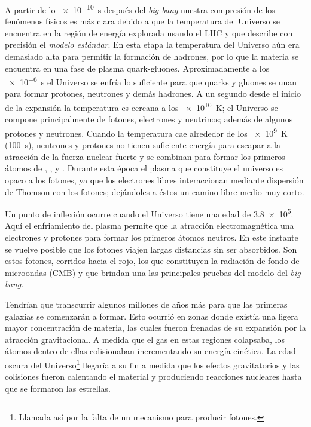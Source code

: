 A partir de lo \SI{e-10}{\second} después del \emph{big bang} nuestra compresión de los fenómenos físicos es más clara debido a que la temperatura del Universo se encuentra en la región de energía explorada usando el LHC y que describe con precisión el \emph{modelo estándar}. En esta etapa la temperatura del Universo aún era demasiado alta para permitir la formación de hadrones, por lo que la materia se encuentra en una fase de plasma quark-gluones. Aproximadamente a los \SI{e-6}{\second} el Universo se enfría lo suficiente para que quarks y gluones se unan para formar protones, neutrones y demás hadrones. A un segundo desde el inicio de la expansión la temperatura es cercana a los \SI{e10}{\kelvin}; el Universo se compone principalmente de fotones, electrones y neutrinos; además de algunos protones y neutrones. Cuando la temperatura cae alrededor de los \SI{e9}{\kelvin} (\SI{100}{\second}), neutrones y protones no tienen suficiente energía para escapar a la atracción de la fuerza nuclear fuerte y se combinan para formar los primeros átomos de , ,  y . Durante esta época el plasma que constituye el universo es opaco a los fotones, ya que los electrones libres interaccionan mediante dispersión de Thomson con los fotones; dejándoles a éstos un camino libre medio muy corto.

Un punto de inflexión ocurre cuando el Universo tiene una edad de \SI{3.8e5}{\year}. Aquí el enfriamiento del plasma permite que la atracción electromagnética una electrones y protones para formar los primeros átomos neutros. En este instante se vuelve posible que los fotones viajen largas distancias sin ser absorbidos. Son estos fotones, corridos hacia el rojo, los que constituyen la radiación de fondo de microondas (CMB) y que brindan una las principales pruebas del modelo del \emph{big bang}.

Tendrían que transcurrir algunos millones de años más para que las primeras galaxias se comenzarán a formar. Esto ocurrió en zonas donde existía una ligera mayor concentración de materia, las cuales fueron frenadas de su expansión por la atracción gravitacional. A medida que el gas en estas regiones colapsaba, los átomos dentro de ellas colisionaban incrementando su energía cinética. La edad oscura del Universo\footnote{Llamada así por la falta de un mecanismo para producir fotones.} llegaría a su fin a medida que los efectos gravitatorios y las colisiones fueron calentando el material y produciendo reacciones nucleares hasta que se formaron las estrellas.

